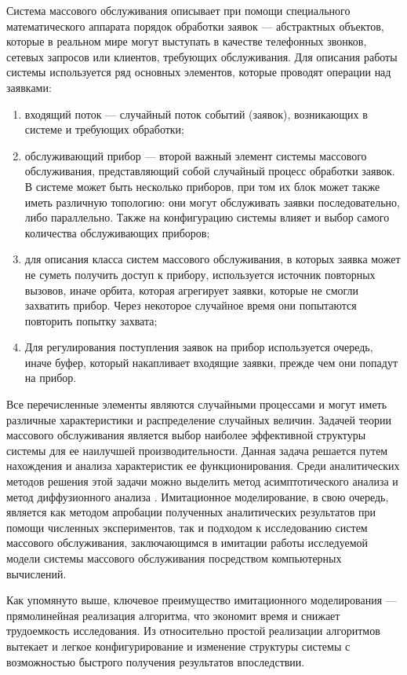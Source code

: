 Система массового обслуживания описывает при помощи специального математического аппарата \cite{nazarov2010theory} порядок обработки заявок --- абстрактных объектов, которые в реальном мире могут выступать в качестве телефонных звонков, сетевых запросов или клиентов, требующих обслуживания. Для описания работы системы используется ряд основных элементов, которые проводят операции над заявками:
\begin{enumerate}
	\item входящий поток --- случайный поток событий (заявок), возникающих в системе и требующих обработки;
	\item обслуживающий прибор --- второй важный элемент системы массового обслуживания, представляющий собой случайный процесс обработки заявок. В системе может быть несколько приборов, при том их блок может также иметь различную топологию: они могут обслуживать заявки последовательно, либо параллельно. Также на конфигурацию системы влияет и выбор самого количества обслуживающих приборов;
	\item для описания класса систем массового обслуживания, в которых заявка может не суметь получить доступ к прибору, используется источник повторных вызовов, иначе орбита, которая агрегирует заявки, которые не смогли захватить прибор. Через некоторое случайное время они попытаются повторить попытку захвата;
	\item Для регулирования поступления заявок на прибор используется очередь, иначе буфер, который накапливает входящие заявки, прежде чем они попадут на прибор.
\end{enumerate} 

Все перечисленные элементы являются случайными процессами и могут иметь различные характеристики и распределение случайных величин. Задачей теории массового обслуживания является выбор наиболее эффективной структуры системы для ее наилучшей производительности. Данная задача решается путем нахождения и анализа характеристик ее функционирования. Среди аналитических методов решения этой задачи можно выделить метод асимптотического анализа \cite{назаров1991асимптотический} и метод диффузионного анализа \cite{назаров2021исследование}. Имитационное моделирование, в свою очередь, является как методом апробации полученных аналитических результатов при помощи численных экспериментов, так и подходом к исследованию систем массового обслуживания, заключающимся в имитации работы исследуемой модели системы массового обслуживания посредством компьютерных вычислений. 

Как упомянуто выше, ключевое преимущество имитационного моделирования --- прямолинейная реализация алгоритма, что экономит время и снижает трудоемкость исследования. Из относительно простой реализации алгоритмов вытекает и легкое конфигурирование и изменение структуры системы с возможностью быстрого получения результатов впоследствии.

